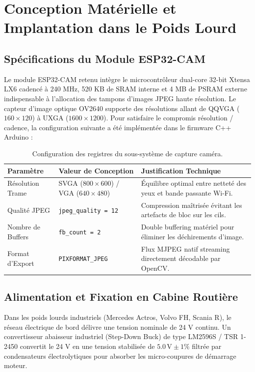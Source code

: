 \documentclass[11pt,a4paper]{article}
\begin{document}
\section{Conception Matérielle et Implantation dans le Poids Lourd}

\subsection{Spécifications du Module ESP32-CAM}
Le module ESP32-CAM retenu intègre le microcontrôleur dual-core 32-bit Xtensa LX6 cadencé à 240 MHz, 520 KB de SRAM interne et 4 MB de PSRAM externe indispensable à l'allocation des tampons d'images JPEG haute résolution. Le capteur d'image optique OV2640 supporte des résolutions allant de QQVGA ($160\times120$) à UXGA ($1600\times1200$). Pour satisfaire le compromis résolution / cadence, la configuration suivante a été implémentée dans le firmware C++ Arduino :

\begin{table}[H]
\centering
\small
\begin{tabularx}{\textwidth}{l p{4.5cm} X}
\toprule
\textbf{Paramètre} & \textbf{Valeur de Conception} & \textbf{Justification Technique} \\
\midrule
Résolution Trame & SVGA ($800\times600$) / VGA ($640\times480$) & Équilibre optimal entre netteté des yeux et bande passante Wi-Fi. \\
Qualité JPEG & \texttt{jpeg\_quality = 12} & Compression maîtrisée évitant les artefacts de bloc sur les cils. \\
Nombre de Buffers & \texttt{fb\_count = 2} & Double buffering matériel pour éliminer les déchirements d'image. \\
Format d'Export & \texttt{PIXFORMAT\_JPEG} & Flux MJPEG natif streaming directement décodable par OpenCV. \\
\bottomrule
\end{tabularx}
\caption{Configuration des registres du sous-système de capture caméra.}
\label{tab:cam_specs}
\end{table}

\subsection{Alimentation et Fixation en Cabine Routière}
Dans les poids lourds industriels (Mercedes Actros, Volvo FH, Scania R), le réseau électrique de bord délivre une tension nominale de 24 V continu. Un convertisseur abaisseur industriel (Step-Down Buck) de type LM2596S / TSR 1-2450 convertit le 24 V en une tension stabilisée de $5.0\,\text{V} \pm 1\%$ filtrée par condensateurs électrolytiques pour absorber les micro-coupures de démarrage moteur.
\end{document}
